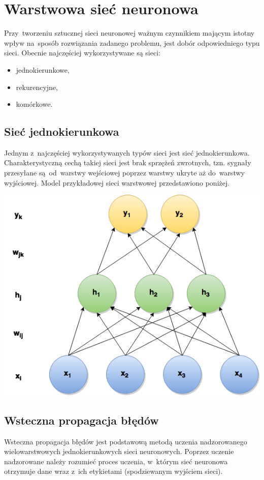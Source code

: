\section{Warstwowa sieć neuronowa}
Przy~tworzeniu sztucznej sieci neuronowej ważnym czynnikiem mającym istotny wpływ na~sposób rozwiązania
zadanego problemu, jest dobór odpowiedniego typu sieci. Obecnie najczęściej wykorzystywane są sieci:
\begin{itemize}
  \item jednokierunkowe,
  \item rekurencyjne,
  \item komórkowe.
\end{itemize}

\subsection{Sieć jednokierunkowa}
Jednym z~najczęściej wykorzystywanych typów sieci jest sieć jednokierunkowa. Charakterystyczną cechą takiej
sieci jest brak sprzężeń zwrotnych, tzn. sygnały przesyłane są~od~warstwy wejściowej poprzez warstwy ukryte
aż do~warstwy wyjściowej. Model przykładowej sieci warstwowej przedstawiono poniżej.

\begin{Figure}
	\centering
	\includegraphics[width=0.9\linewidth]{img/mgr_backprop_net.png}
\end{Figure}

\subsection{Wsteczna propagacja błędów}
Wsteczna propagacja błędów jest podstawową metodą uczenia nadzorowanego wielowarstwowych jednokierunkowych
sieci neuronowych. Poprzez uczenie nadzorowane należy rozumieć proces uczenia, w~którym sieć neuronowa
otrzymuje dane wraz z~ich etykietami (spodziewanym wyjściem sieci).

